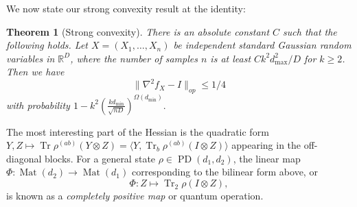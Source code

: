 \documentclass[aos]{imsart}
\newtheorem{theorem}{Theorem}[section]
\theoremstyle{definition}
\numberwithin{equation}{section}
\DeclareMathOperator{\poly}{poly}
\DeclareMathOperator{\mat}{Mat}
\DeclareMathOperator{\tr}{Tr}
\DeclareMathOperator{\PD}{PD}
\DeclarePairedDelimiter{\norm}{\lVert}{\rVert}
\newcommand{\R}{{\mathbb{R}}}
\newcommand{\ot}{\otimes}
\newcommand{\eps}{\varepsilon}
\newcommand{\samp}{x}
\newcommand{\rv}{X}
\newcommand{\CF}[1]{{\color{purple}[CF: #1]}}
\newcommand{\MW}[1]{{\color{red}[MW: #1]}}
\newcommand{\TODO}[1]{{\color{blue}[TODO: #1]}}
\begin{document}







We now state our strong convexity result at the identity:


\begin{theorem}[Strong convexity]\label{thm:tensor-convexity} There is an absolute constant $C$ such that the following holds. Let $\rv = (\rv_1,\dots,\rv_n)$ be independent standard Gaussian random variables in $\R^D$, where the number of samples $n$ is at least $C k^2 d_{\max}^2/D$ for $k \geq 2$. Then we have
$$ \|\nabla^{2} f_{\rv} - I\|_{op} \leq 1/4$$
with probability $1 - k^2 \left(\frac {kd_{\min}}{\sqrt{nD}}\right)^{ \Omega(d_{\min})}.$
\end{theorem}



The most interesting part of the Hessian is the quadratic form $Y,Z \mapsto \tr \rho^{(ab)} \left( Y \ot Z \right) = \langle Y, \tr_b \rho^{(ab)} \left(I \ot Z\right) \rangle$ appearing in the off-diagonal blocks. For a general state $\rho \in \PD(d_1, d_2)$, the linear map $\Phi:\mat(d_2) \to \mat(d_1)$ corresponding to the bilinear form above, or
$$\Phi: Z \mapsto \tr_2 \rho \left(I \ot Z\right),$$
 is known as a \emph{completely positive map} or quantum operation. 
 
\end{document}
